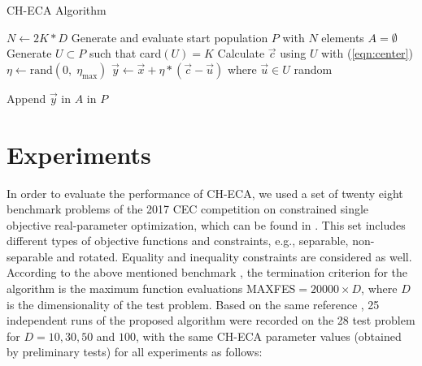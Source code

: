 \documentclass[conference]{IEEEtran}
\begin{document}
\begin{algorithm}[!ht]
	\caption{CH-ECA Algorithm}
	\label{alg:ch.eca}
	\begin{algorithmic}[1]
 		\renewcommand{\algorithmicrequire}{\textbf{Input:}}
 		\renewcommand{\algorithmicensure}{\textbf{Output:}}
		\STATE $N \gets 2K * D$
		\STATE Generate and evaluate start population $P$ with $N$ elements
			\STATE $A = \emptyset$
				\STATE Generate $U \subset P$ such that  card$(U) = K$
				\STATE Calculate $\vec{c}$ using $U$ with (\ref{eqn:center})
				\STATE $\eta \gets \text{rand}(0,\; \eta_{\max}) $ 
				\STATE $\vec{y} \gets \vec{x} + \eta  * (\vec{c} - \vec{u}) $ 
						where $ \vec{u} \in U $ random
				
					\STATE Append $\vec{y} $ in $A$
				\ENDIF
			\ENDFOR
		\ENDWHILE
		 in $P$
	\end{algorithmic}
\end{algorithm}


\section{Experiments} %
\label{sec:experiments}

In order to evaluate the performance of CH-ECA, we used a set of twenty eight 
benchmark problems of the 2017 CEC competition on constrained single objective 
real-parameter optimization, which can be found in \cite{cecCop17}. This set 
includes different types of objective functions and constraints, e.g., separable, 
non-separable and rotated. Equality and inequality constraints are considered as well.\\

According to the above mentioned benchmark \cite{cecCop17}, the termination criterion 
for the algorithm is the maximum function evaluations MAXFES$=20000 \times D$, where 
$D$ is the dimensionality of the test problem. Based on the same reference \cite{cecCop17}, 25
independent runs of the proposed algorithm were recorded on the 28 test problem 
for $D = 10, 30, 50$ and $100$, with the same CH-ECA parameter values (obtained 
by preliminary tests) for all experiments as follows:
\end{document}
